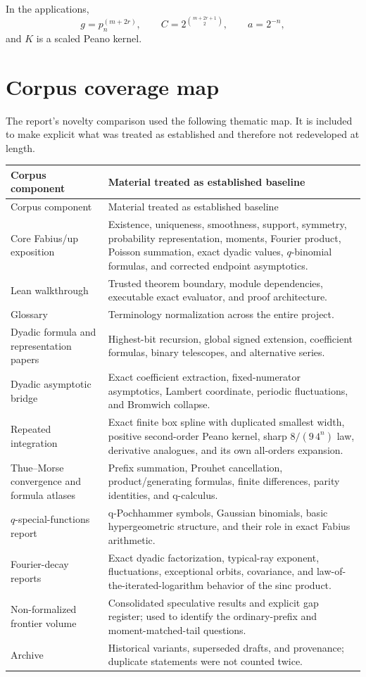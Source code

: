 \documentclass[11pt]{article}
\numberwithin{equation}{section}
\theoremstyle{definition}
\theoremstyle{remark}
\begin{document}
In the applications,
\[
 g=p_n^{(m+2r)},
 \qquad
 C=2^{\binom{m+2r+1}{2}},
 \qquad
 a=2^{-n},
\]
and $K$ is a scaled Peano kernel.

\section{Corpus coverage map}
\label{app:coverage}

The report's novelty comparison used the following thematic map.  It is included to make explicit what was treated as established and therefore not redeveloped at length.

\begin{longtable}{@{}p{}p{}@{}}
\toprule
Corpus component & Material treated as established baseline\\
\midrule
\endfirsthead
\toprule
Corpus component & Material treated as established baseline\\
\midrule
\endhead
Core Fabius/up exposition & Existence, uniqueness, smoothness, support, symmetry, probability representation, moments, Fourier product, Poisson summation, exact dyadic values, $q$-binomial formulas, and corrected endpoint asymptotics.\\
Lean walkthrough & Trusted theorem boundary, module dependencies, executable exact evaluator, and proof architecture.\\
Glossary & Terminology normalization across the entire project.\\
Dyadic formula and representation papers & Highest-bit recursion, global signed extension, coefficient formulas, binary telescopes, and alternative series.\\
Dyadic asymptotic bridge & Exact coefficient extraction, fixed-numerator asymptotics, Lambert coordinate, periodic fluctuations, and Bromwich collapse.\\
Repeated integration & Exact finite box spline with duplicated smallest width, positive second-order Peano kernel, sharp $8/(9\,4^n)$ law, derivative analogues, and its own all-orders expansion.\\
Thue--Morse convergence and formula atlases & Prefix summation, Prouhet cancellation, product/generating formulas, finite differences, parity identities, and q-calculus.\\
$q$-special-functions report & q-Pochhammer symbols, Gaussian binomials, basic hypergeometric structure, and their role in exact Fabius arithmetic.\\
Fourier-decay reports & Exact dyadic factorization, typical-ray exponent, fluctuations, exceptional orbits, covariance, and law-of-the-iterated-logarithm behavior of the sinc product.\\
Non-formalized frontier volume & Consolidated speculative results and explicit gap register; used to identify the ordinary-prefix and moment-matched-tail questions.\\
Archive & Historical variants, superseded drafts, and provenance; duplicate statements were not counted twice.\\
\bottomrule
\end{longtable}
\end{document}
